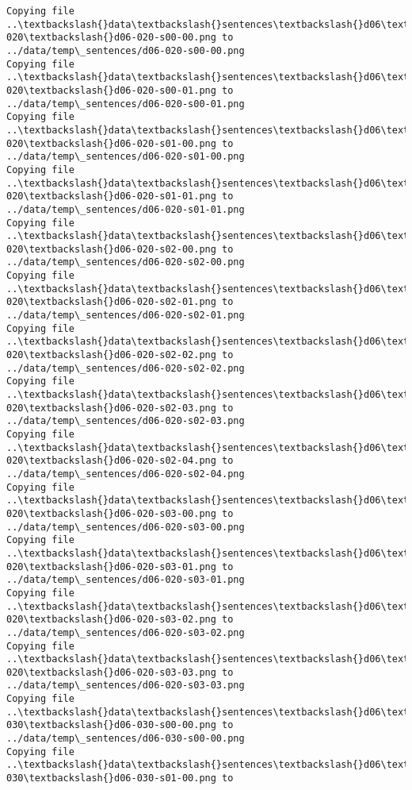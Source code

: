 \documentclass[11pt]{article}
\begin{document}
\begin{Verbatim}[commandchars=\\\{\}]
Copying file ..\textbackslash{}data\textbackslash{}sentences\textbackslash{}d06\textbackslash{}d06-020\textbackslash{}d06-020-s00-00.png to
../data/temp\_sentences/d06-020-s00-00.png
Copying file ..\textbackslash{}data\textbackslash{}sentences\textbackslash{}d06\textbackslash{}d06-020\textbackslash{}d06-020-s00-01.png to
../data/temp\_sentences/d06-020-s00-01.png
Copying file ..\textbackslash{}data\textbackslash{}sentences\textbackslash{}d06\textbackslash{}d06-020\textbackslash{}d06-020-s01-00.png to
../data/temp\_sentences/d06-020-s01-00.png
Copying file ..\textbackslash{}data\textbackslash{}sentences\textbackslash{}d06\textbackslash{}d06-020\textbackslash{}d06-020-s01-01.png to
../data/temp\_sentences/d06-020-s01-01.png
Copying file ..\textbackslash{}data\textbackslash{}sentences\textbackslash{}d06\textbackslash{}d06-020\textbackslash{}d06-020-s02-00.png to
../data/temp\_sentences/d06-020-s02-00.png
Copying file ..\textbackslash{}data\textbackslash{}sentences\textbackslash{}d06\textbackslash{}d06-020\textbackslash{}d06-020-s02-01.png to
../data/temp\_sentences/d06-020-s02-01.png
Copying file ..\textbackslash{}data\textbackslash{}sentences\textbackslash{}d06\textbackslash{}d06-020\textbackslash{}d06-020-s02-02.png to
../data/temp\_sentences/d06-020-s02-02.png
Copying file ..\textbackslash{}data\textbackslash{}sentences\textbackslash{}d06\textbackslash{}d06-020\textbackslash{}d06-020-s02-03.png to
../data/temp\_sentences/d06-020-s02-03.png
Copying file ..\textbackslash{}data\textbackslash{}sentences\textbackslash{}d06\textbackslash{}d06-020\textbackslash{}d06-020-s02-04.png to
../data/temp\_sentences/d06-020-s02-04.png
Copying file ..\textbackslash{}data\textbackslash{}sentences\textbackslash{}d06\textbackslash{}d06-020\textbackslash{}d06-020-s03-00.png to
../data/temp\_sentences/d06-020-s03-00.png
Copying file ..\textbackslash{}data\textbackslash{}sentences\textbackslash{}d06\textbackslash{}d06-020\textbackslash{}d06-020-s03-01.png to
../data/temp\_sentences/d06-020-s03-01.png
Copying file ..\textbackslash{}data\textbackslash{}sentences\textbackslash{}d06\textbackslash{}d06-020\textbackslash{}d06-020-s03-02.png to
../data/temp\_sentences/d06-020-s03-02.png
Copying file ..\textbackslash{}data\textbackslash{}sentences\textbackslash{}d06\textbackslash{}d06-020\textbackslash{}d06-020-s03-03.png to
../data/temp\_sentences/d06-020-s03-03.png
Copying file ..\textbackslash{}data\textbackslash{}sentences\textbackslash{}d06\textbackslash{}d06-030\textbackslash{}d06-030-s00-00.png to
../data/temp\_sentences/d06-030-s00-00.png
Copying file ..\textbackslash{}data\textbackslash{}sentences\textbackslash{}d06\textbackslash{}d06-030\textbackslash{}d06-030-s01-00.png to

\end{Verbatim}
\end{document}
